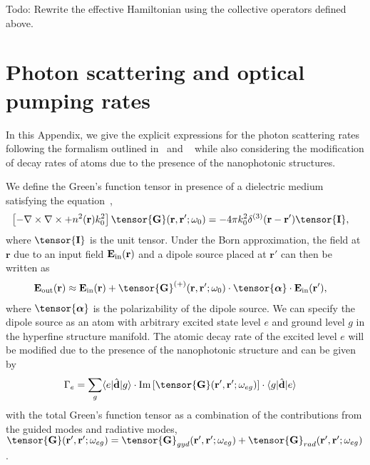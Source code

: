 \documentclass[preprint,aps,pra,onecolumn,superscriptaddress]{revtex4-1} %
\def\br{\mathbf{r}}
\def\bra#1{\langle{#1}\rvert}%
\def\ket#1{\lvert{#1}\rangle}%
\newcommand{\mbf}[1]{\mathbf{#1}}
\newcommand{\inp}{{\rm in}}
\newcommand{\out}{{\rm out}}
\newcommand{\unittens}{\tensor{\mathbf{I}}}
\newcommand{\comment}[1]{{\color{Maroon} #1}}
\begin{document}
\begin{appendix}
\comment{Todo: Rewrite the effective Hamiltonian using the collective operators defined above.}

\section{Photon scattering and optical pumping rates} \label{Appendix::Rates}

In this Appendix, we give the explicit expressions for the photon scattering rates following the formalism outlined in~\cite{Deutsch2010a} and ~\cite{Qi2016} while also considering the modification of decay rates of atoms due to the presence of the nanophotonic structures. 

We define the Green's function tensor in presence of a dielectric medium satisfying the equation~\cite{Qi2016},
	\begin{align} \label{Eq::GreensDiffEq}
		\left[ -\nabla\times\nabla\times + n^2(\mbf{r}) k_0^2 \right] \tensor{\mathbf{G}}(\br, \br';\omega_0) &= -4\pi 
k_0^2 \delta^{(3)}(\mathbf{r}-\mathbf{r}') \unittens,
	\end{align}
where $\unittens$ is the unit tensor.
Under the Born approximation, the field at $\br$ due to an input field $ \mathbf{E}_{\inp}(\br) $ and a dipole source placed at $\br'$ can then be written as
\begin{align}
		\mathbf{E}_{\out}(\br) 
		&\approx \mathbf{E}_{\inp}(\br)+ \tensor{\mathbf{G}}^{(+)}(\br , \br'; \omega_0) \cdot 
\tensor{\boldsymbol{\alpha}}\cdot \mathbf{E}_{\inp}(\br'), \label{Eq::ScatteredField}
\end{align}
where $ \tensor{\boldsymbol{\alpha}} $ is the polarizability of the dipole source.
We can specify the dipole source as an atom with arbitrary excited state level $ e $ and ground level $ g $ in the hyperfine structure manifold. 
The atomic decay rate of the excited level $ e $ will be modified due to the presence of the nanophotonic structure and can be given by
\begin{align}
\Gamma_e &= \sum_g \bra{e}\hat{\mathbf{d}}\ket{g} \cdot \mathrm{Im}\left[\tensor{\mathbf{G}}(\br',\br';\omega_{eg}) \right]\cdot \bra{g}\hat{\mathbf{d}}\ket{e}
\end{align}
with the total Green's function tensor as a combination of the contributions from the guided modes and radiative modes, $ \tensor{\mathbf{G}}(\br',\br';\omega_{eg})=\tensor{\mathbf{G}}_{gyd}(\br',\br';\omega_{eg})+\tensor{\mathbf{G}}_{rad}(\br',\br';\omega_{eg}) $.

\end{appendix}
\end{document}

